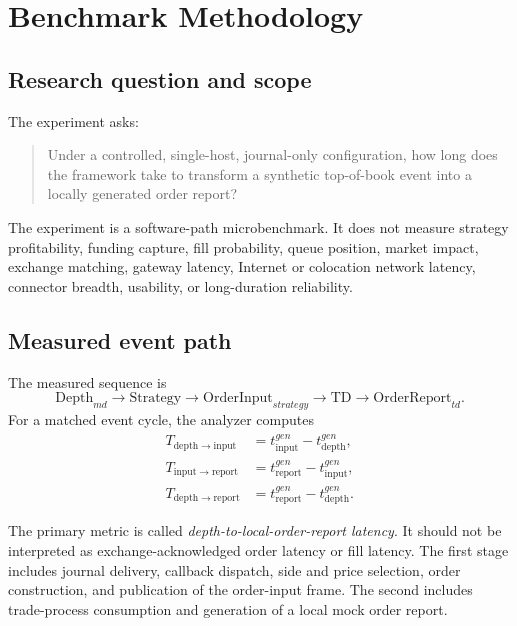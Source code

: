 \documentclass[11pt]{article}
\begin{document}
\section{Benchmark Methodology}

\subsection{Research question and scope}

The experiment asks:
\begin{quote}
Under a controlled, single-host, journal-only configuration, how long does the framework take to transform a synthetic top-of-book event into a locally generated order report?
\end{quote}

The experiment is a software-path microbenchmark. It does not measure strategy profitability, funding capture, fill probability, queue position, market impact, exchange matching, gateway latency, Internet or colocation network latency, connector breadth, usability, or long-duration reliability.

\subsection{Measured event path}

The measured sequence is
\begin{equation}
    \mathrm{Depth}_{md} \rightarrow \mathrm{Strategy}
    \rightarrow \mathrm{OrderInput}_{strategy}
    \rightarrow \mathrm{TD}
    \rightarrow \mathrm{OrderReport}_{td}.
\end{equation}
For a matched event cycle, the analyzer computes
\begin{align}
T_{\mathrm{depth\rightarrow input}}
&= t_{\mathrm{input}}^{gen} - t_{\mathrm{depth}}^{gen}, \\
T_{\mathrm{input\rightarrow report}}
&= t_{\mathrm{report}}^{gen} - t_{\mathrm{input}}^{gen}, \\
T_{\mathrm{depth\rightarrow report}}
&= t_{\mathrm{report}}^{gen} - t_{\mathrm{depth}}^{gen}.
\end{align}

The primary metric is called \emph{depth-to-local-order-report latency}. It should not be interpreted as exchange-acknowledged order latency or fill latency. The first stage includes journal delivery, callback dispatch, side and price selection, order construction, and publication of the order-input frame. The second includes trade-process consumption and generation of a local mock order report.
\end{document}
